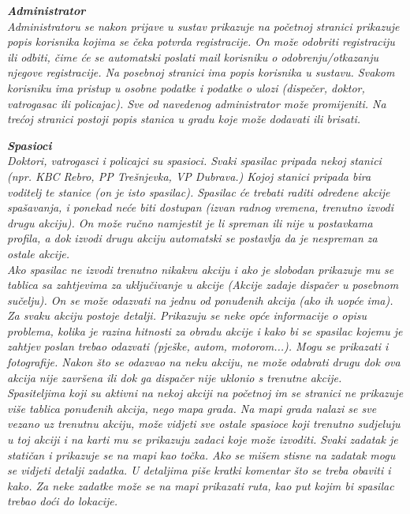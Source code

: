 		\textbf{\textit{Administrator}}\\
		\textit{Administratoru se nakon prijave u sustav prikazuje na početnoj stranici prikazuje popis korisnika kojima se čeka potvrda registracije. On može odobriti registraciju ili odbiti, čime će se automatski poslati mail korisniku o odobrenju/otkazanju njegove registracije. Na posebnoj stranici ima popis korisnika u sustavu. Svakom korisniku ima pristup u osobne podatke i podatke o ulozi (dispečer, doktor, vatrogasac ili policajac). Sve od navedenog administrator može promijeniti. Na trećoj stranici postoji popis stanica u gradu koje može dodavati ili brisati.}
		
		\textbf{\textit{Spasioci}}\\
		\textit{Doktori, vatrogasci i policajci su spasioci. Svaki spasilac pripada nekoj stanici (npr. KBC Rebro, PP Trešnjevka, VP Dubrava.) Kojoj stanici pripada bira voditelj te stanice (on je isto spasilac). Spasilac će trebati raditi određene akcije spašavanja, i ponekad neće biti dostupan (izvan radnog vremena, trenutno izvodi drugu akciju). On može ručno namjestit je li spreman ili nije u postavkama profila, a dok izvodi drugu akciju automatski se postavlja da je nespreman za ostale akcije.\\
		Ako spasilac ne izvodi trenutno nikakvu akciju i ako je slobodan prikazuje mu se tablica sa zahtjevima za uključivanje u akcije (Akcije zadaje dispačer u posebnom sučelju). On se može odazvati na jednu od ponuđenih akcija (ako ih uopće ima). Za svaku akciju postoje detalji. Prikazuju se neke opće informacije o opisu problema, kolika je razina hitnosti za obradu akcije i kako bi se spasilac kojemu je zahtjev poslan trebao odazvati (pješke, autom, motorom...). Mogu se prikazati i fotografije. Nakon što se odazvao na neku akciju, ne može odabrati drugu dok ova akcija nije završena ili dok ga dispačer nije uklonio s trenutne akcije.\\
		Spasiteljima koji su aktivni na nekoj akciji na početnoj im se stranici ne prikazuje više tablica ponuđenih akcija, nego mapa grada. Na mapi grada nalazi se sve vezano uz trenutnu akciju, može vidjeti sve ostale spasioce koji trenutno sudjeluju u toj akciji i na karti mu se prikazuju zadaci koje može izvoditi. Svaki zadatak je statičan i prikazuje se na mapi kao točka. Ako se mišem stisne na zadatak mogu se vidjeti detalji zadatka. U detaljima piše kratki komentar što se treba obaviti i kako. Za neke zadatke može se na mapi prikazati ruta, kao put kojim bi spasilac trebao doći do lokacije.
		}
	
